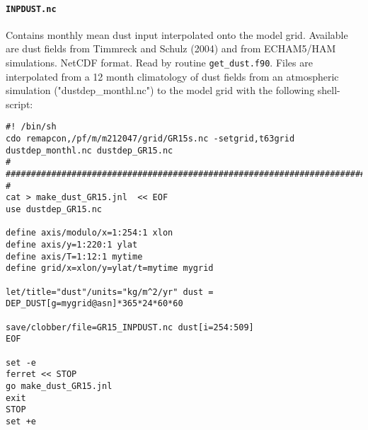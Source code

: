 \documentclass[11pt,a4paper,fleqn,twoside]{article}
\begin{document}
\paragraph{\tt INPDUST.nc} Contains monthly mean dust input interpolated onto the model grid. 
Available are dust fields from Timmreck and Schulz (2004)\nocite{timmreck:2004}
and from ECHAM5/HAM simulations. NetCDF format. Read by routine {\tt get\_dust.f90}.
Files are interpolated from a 12 month climatology of dust fields from an atmospheric simulation 
("dustdep\_monthl.nc") to the model grid with the following shell-script:
\begin{footnotesize}
\begin{verbatim}
#! /bin/sh
cdo remapcon,/pf/m/m212047/grid/GR15s.nc -setgrid,t63grid dustdep_monthl.nc dustdep_GR15.nc
#
###########################################################################
#
cat > make_dust_GR15.jnl  << EOF
use dustdep_GR15.nc

define axis/modulo/x=1:254:1 xlon
define axis/y=1:220:1 ylat
define axis/T=1:12:1 mytime
define grid/x=xlon/y=ylat/t=mytime mygrid

let/title="dust"/units="kg/m^2/yr" dust = DEP_DUST[g=mygrid@asn]*365*24*60*60

save/clobber/file=GR15_INPDUST.nc dust[i=254:509]
EOF

set -e
ferret << STOP
go make_dust_GR15.jnl
exit
STOP
set +e
\end{verbatim}
\end{footnotesize}


\end{document}
